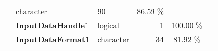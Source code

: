 \documentclass[]{article}
\begin{document}
\begin{longtable}[]{@{}lllrcl@{}}
\begin{minipage}[t]{0.35\columnwidth}
\end{minipage} & \begin{minipage}[t]{0.11\columnwidth}\raggedright\strut
character\strut
\end{minipage} & \begin{minipage}[t]{0.10\columnwidth}\raggedleft\strut
90\strut
\end{minipage} & \begin{minipage}[t]{0.10\columnwidth}\centering\strut
86.59 \%\strut
\end{minipage} & \begin{minipage}[t]{0.12\columnwidth}\raggedright\strut
\strut
\end{minipage}\tabularnewline
\begin{minipage}[t]{0.07\columnwidth}\raggedright\strut
\strut
\end{minipage} & \begin{minipage}[t]{0.35\columnwidth}\raggedright\strut
\textbf{\protect\hyperlink{inputdatahandle1}{InputDataHandle1}}\strut
\end{minipage} & \begin{minipage}[t]{0.11\columnwidth}\raggedright\strut
logical\strut
\end{minipage} & \begin{minipage}[t]{0.10\columnwidth}\raggedleft\strut
1\strut
\end{minipage} & \begin{minipage}[t]{0.10\columnwidth}\centering\strut
100.00 \%\strut
\end{minipage} & \begin{minipage}[t]{0.12\columnwidth}\raggedright\strut
\strut
\end{minipage}\tabularnewline
\begin{minipage}[t]{0.07\columnwidth}\raggedright\strut
\strut
\end{minipage} & \begin{minipage}[t]{0.35\columnwidth}\raggedright\strut
\textbf{\protect\hyperlink{inputdataformat1}{InputDataFormat1}}\strut
\end{minipage} & \begin{minipage}[t]{0.11\columnwidth}\raggedright\strut
character\strut
\end{minipage} & \begin{minipage}[t]{0.10\columnwidth}\raggedleft\strut
34\strut
\end{minipage} & \begin{minipage}[t]{0.10\columnwidth}\centering\strut
81.92 \%\strut
\end{minipage} & \begin{minipage}[t]{0.12\columnwidth}\raggedright\strut

\end{minipage}
\end{longtable}
\end{document}
